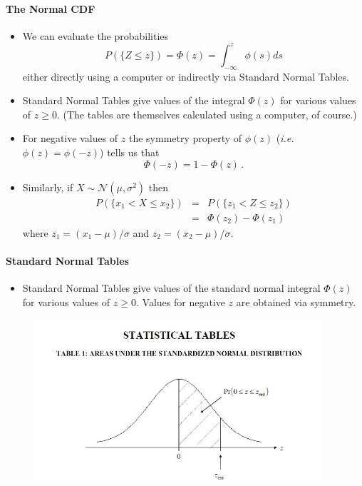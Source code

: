\documentclass[notes=show,smaller]{beamer}\usepackage[]{graphicx}\usepackage[]{color}
\renewcommand{\Pr}{P}
\newcommand{\N}{\mathcal{N}}
\newenvironment{stepitemize}{\begin{itemize}[<+->]}{\end{itemize} }
\begin{document}
\begin{frame}{\subsecname}
\framesubtitle{The Normal CDF}

  \begin{stepitemize}
  \item We can evaluate the probabilities
  $$
  \Pr(\{Z\leq z\})=\Phi(z)=\int_{-\infty}^z\phi(s)ds
  $$
  either directly using a computer or indirectly via Standard Normal
  Tables.
  \item Standard Normal Tables give values of the integral $\Phi(z)$ for various values of $z\geq 0$. (The tables are themselves
  calculated using a computer, of course.)
  \item For negative values of $z$ the symmetry property of $\phi(z)$ (\textit{i.e.} $\phi(z)=\phi(-z)$) tells us that
  $$
  \Phi(-z)=1-\Phi(z)\,.
  $$
  \item Similarly, if $X\sim \N\left( \mu ,\sigma ^{2}\right) $ then
  \begin{eqnarray*}
  \Pr(\{x_1<X\leq x_2\})&=&\Pr(\{z_1<Z\leq z_2\})\\
   &=&\Phi(z_2)-\Phi(z_1)
   \end{eqnarray*}
  where $z_1=(x_1-\mu)/\sigma$ and $z_2=(x_2-\mu)/\sigma$.

  \end{stepitemize}
\end{frame}

\begin{frame}{\subsecname}
\framesubtitle{Standard Normal Tables}

  \begin{stepitemize}
  \item Standard Normal Tables give values of the standard normal integral $\Phi(z)$ for various values of $z\geq 0$.  Values for negative $z$ are obtained via symmetry.
  \end{stepitemize}


  \begin{figure}[ptb]\centering
  \includegraphics[width=0.95\textwidth,height=0.75\textheight]{img/bell_curve__5.pdf}%
  \end{figure}%
  \end{frame}%
\end{document}
